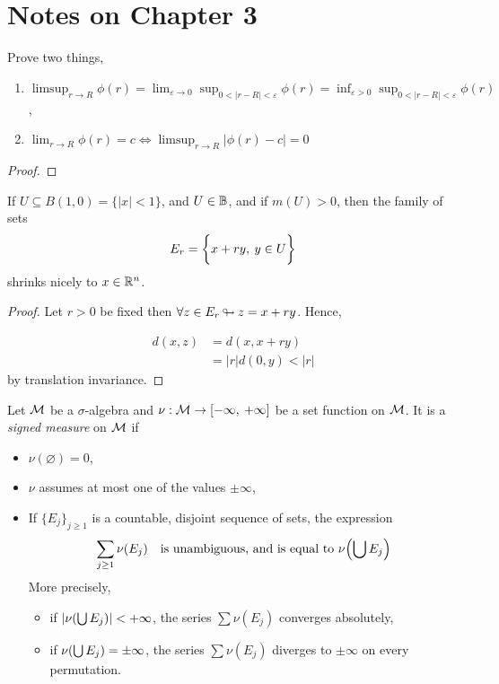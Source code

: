 \documentclass[../../main.tex]{subfiles}
\begin{document}
\section*{Notes on Chapter 3}
\begin{wts}
    Prove two things,
    \begin{enumerate}
        \item $\limsup_{r\to R}\phi(r)=\lim_{\varepsilon\to 0}\sup_{0<|r-R|<\varepsilon}\phi(r)=\inf_{\varepsilon>0}\sup_{0<|r-R|<\varepsilon}\phi(r)$,
        \item $\lim_{r\to R}\phi(r)=c\iff \limsup_{r\to R}|\phi(r)-c|=0$
    \end{enumerate}
\end{wts}
\begin{proof}
    
\end{proof}



\newpage
\begin{wts}
    If $U\subseteq B(1,0)=\{|x|<1\}$, and $U\in{\mathbb{B}}$, and if $m(U)>0$, then the family of sets 
    \[
    E_r = \biggl\{{x+ry,\:y\in U}\biggr\}
    \]
    shrinks nicely to $x\in{\mathbb{R}^n}$.
\end{wts}
\begin{proof}
    Let $r>0$ be fixed then $\forall z\in E_r{\:\looparrowright\:} z = x+ry$. Hence,
    
    \begin{align*}
        d(x,z) &= d(x, x + ry)\\
                &= |r|d(0,y)<|r|
    \end{align*}
    by translation invariance.
\end{proof}
\newpage

\begin{definition}
    Let $\mathcal{M}$ be a $\sigma$-algebra and $\nu:\mathcal{M}\to [-\infty,\: +\infty]$ be a set function on $\mathcal{M}$. It is a \emph{signed measure} on $\mathcal{M}$ if 
    \begin{itemize}
        \item $\nu(\varnothing)=0$,
        \item $\nu$ assumes at most one of the values $\pm\infty$,
        \item If $\{E_j\}_{j\geq 1}$ is a countable, disjoint sequence of sets, the expression
        \[
            \sum_{j\geq 1}\nu(E_j)\quad\text{is unambiguous, and is equal to }\nu\qty(\bigcup E_j)
        \]
        More precisely, 
        \begin{itemize}
            \item if $\qty|\nu\qty(\bigcup E_j)|<+\infty$, the series $\sum \nu(E_j)$ converges absolutely,
            \item if $\nu\qty(\bigcup E_j)= \pm\infty$, the series $\sum \nu(E_j)$ diverges to $\pm\infty$ on every permutation.
        \end{itemize}
    \end{itemize}
\end{definition}
\end{document}
